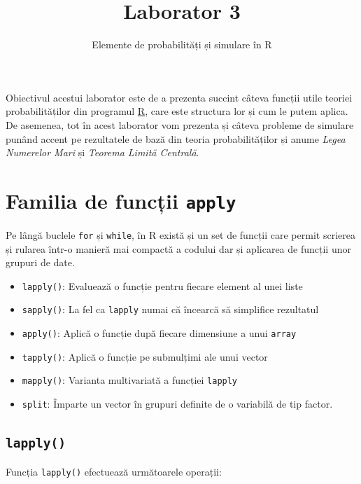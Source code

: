 \documentclass[]{article}
\title{Laborator 3}
\subtitle{Elemente de probabilități și simulare în R}
\author{}
\date{}
\newcounter{exo}[section]
\begin{document}
\maketitle

\thispagestyle{fancy}

Obiectivul acestui laborator este de a prezenta succint câteva funcții
utile teoriei probabilităților din programul
\href{https://cran.r-project.org/}{R}, care este structura lor și cum le
putem aplica. De asemenea, tot în acest laborator vom prezenta și câteva
probleme de simulare punând accent pe rezultatele de bază din teoria
probabilităților și anume \emph{Legea Numerelor Mari} și \emph{Teorema
Limită Centrală}.

\hypertarget{familia-de-funcux21bii-apply}{%
\section{\texorpdfstring{Familia de funcții
\texttt{apply}}{Familia de funcții apply}}\label{familia-de-funcux21bii-apply}}

Pe lângă buclele \texttt{for} și \texttt{while}, în R există și un set
de funcții care permit scrierea și rularea într-o manieră mai compactă a
codului dar și aplicarea de funcții unor grupuri de date.

\begin{itemize}
\item
  \texttt{lapply()}: Evaluează o funcție pentru fiecare element al unei
  liste
\item
  \texttt{sapply()}: La fel ca \texttt{lapply} numai că încearcă să
  simplifice rezultatul
\item
  \texttt{apply()}: Aplică o funcție după fiecare dimensiune a unui
  \texttt{array}
\item
  \texttt{tapply()}: Aplică o funcție pe submulțimi ale unui vector
\item
  \texttt{mapply()}: Varianta multivariată a funcției \texttt{lapply}
\item
  \texttt{split}: Împarte un vector în grupuri definite de o variabilă
  de tip factor.
\end{itemize}

\hypertarget{lapply}{%
\subsection{\texorpdfstring{\texttt{lapply()}}{lapply()}}\label{lapply}}

Funcția \texttt{lapply()} efectuează următoarele operații:
\end{document}
